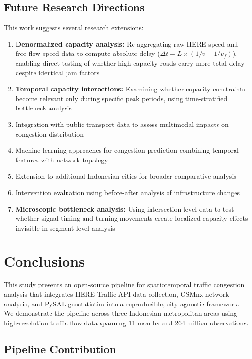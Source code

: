 \documentclass[12pt,a4paper]{article}
\begin{document}
\subsection{Future Research Directions}

This work suggests several research extensions:

\begin{enumerate}
\def\labelenumi{\arabic{enumi}.}

\item
  \textbf{Denormalized capacity analysis:} Re-aggregating raw HERE speed and free-flow speed data to compute absolute delay (\(\Delta t = L \times (1/v - 1/v_f)\)), enabling direct testing of whether high-capacity roads carry more total delay despite identical jam factors
\item
  \textbf{Temporal capacity interactions:} Examining whether capacity constraints become relevant only during specific peak periods, using time-stratified bottleneck analysis
\item
  Integration with public transport data to assess multimodal impacts on congestion distribution
\item
  Machine learning approaches for congestion prediction combining temporal features with network topology
\item
  Extension to additional Indonesian cities for broader comparative analysis
\item
  Intervention evaluation using before-after analysis of infrastructure changes
\item
  \textbf{Microscopic bottleneck analysis:} Using intersection-level data to test whether signal timing and turning movements create localized capacity effects invisible in segment-level analysis
\end{enumerate}



\section{Conclusions}

This study presents an open-source pipeline for spatiotemporal traffic congestion analysis that integrates HERE Traffic API data collection, OSMnx network analysis, and PySAL geostatistics into a reproducible, city-agnostic framework. We demonstrate the pipeline across three Indonesian metropolitan areas using high-resolution traffic flow data spanning 11 months and 264 million observations.

\subsection{Pipeline Contribution}
\end{document}
